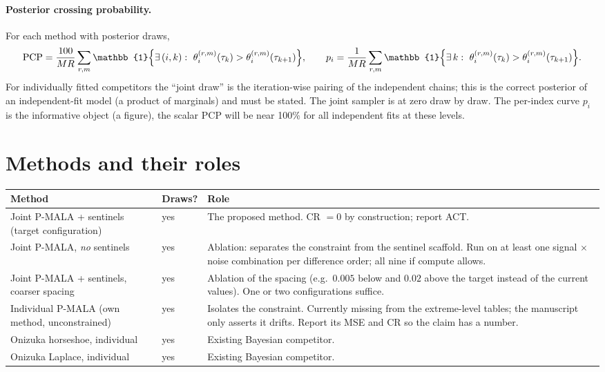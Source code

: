 \documentclass[11pt]{article}
\newcommand{\ind}{\mathbb{1}}
\begin{document}
\paragraph{Posterior crossing probability.} For each method with posterior draws,
\[
\mathrm{PCP} = \frac{100}{MR}\sum_{r,m}\ind\Bigl\{\exists\,(i,k):\ \theta^{(r,m)}_i(\tau_k) > \theta^{(r,m)}_i(\tau_{k+1})\Bigr\},
\qquad
p_i = \frac{1}{MR}\sum_{r,m}\ind\Bigl\{\exists\,k:\ \theta^{(r,m)}_i(\tau_k) > \theta^{(r,m)}_i(\tau_{k+1})\Bigr\}.
\]
For individually fitted competitors the ``joint draw'' is the iteration-wise pairing of the independent chains; this is the correct posterior of an independent-fit model (a product of marginals) and must be stated. The joint sampler is at zero draw by draw. The per-index curve $p_i$ is the informative object (a figure), the scalar PCP will be near 100\% for all independent fits at these levels.

\section{Methods and their roles}
\label{sec:methods}

\begin{center}
\begin{tabular}{p{4.6cm}p{2.2cm}p{7.6cm}}
\toprule
Method & Draws? & Role \\
\midrule
Joint P-MALA + sentinels (target configuration) & yes & The proposed method. CR $=0$ by construction; report ACT. \\
Joint P-MALA, \emph{no} sentinels & yes & Ablation: separates the constraint from the sentinel scaffold. Run on at least one signal $\times$ noise combination per difference order; all nine if compute allows. \\
Joint P-MALA + sentinels, coarser spacing & yes & Ablation of the spacing (e.g.\ $0.005$ below and $0.02$ above the target instead of the current values). One or two configurations suffice. \\
Individual P-MALA (own method, unconstrained) & yes & Isolates the constraint. Currently missing from the extreme-level tables; the manuscript only asserts it drifts. Report its MSE and CR so the claim has a number. \\
Onizuka horseshoe, individual & yes & Existing Bayesian competitor. \\
Onizuka Laplace, individual & yes & Existing Bayesian competitor. \\
\bottomrule
\end{tabular}
\end{center}
\end{document}
